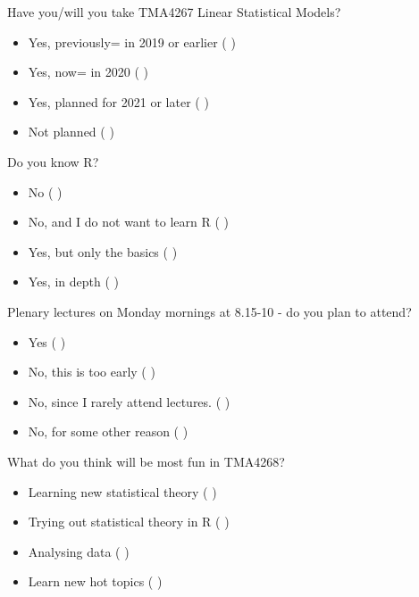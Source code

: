 \documentclass[ignorenonframetext,]{beamer}
\providecommand{\tightlist}{%
  \setlength{\itemsep}{0pt}\setlength{\parskip}{0pt}}
\begin{document}
\begin{frame}

\begin{block}{Have you/will you take TMA4267 Linear Statistical Models?}

\begin{itemize}
\tightlist
\item
  Yes, previously= in 2019 or earlier ( )
\item
  Yes, now= in 2020 ( )
\item
  Yes, planned for 2021 or later ( )
\item
  Not planned ( )
\end{itemize}

\end{block}

\begin{block}{Do you know R?}

\begin{itemize}
\tightlist
\item
  No ( )
\item
  No, and I do not want to learn R ( )
\item
  Yes, but only the basics ( )
\item
  Yes, in depth ( )
\end{itemize}

\end{block}

\end{frame}

\begin{frame}

\begin{block}{Plenary lectures on Monday mornings at 8.15-10 - do you
plan to attend?}

\begin{itemize}
\tightlist
\item
  Yes ( )
\item
  No, this is too early ( )
\item
  No, since I rarely attend lectures. ( )
\item
  No, for some other reason ( )
\end{itemize}

\end{block}

\begin{block}{What do you think will be most fun in TMA4268?}

\begin{itemize}
\tightlist
\item
  Learning new statistical theory ( )
\item
  Trying out statistical theory in R ( )
\item
  Analysing data ( )
\item
  Learn new hot topics ( )
\end{itemize}

\end{block}

\end{frame}
\end{document}
